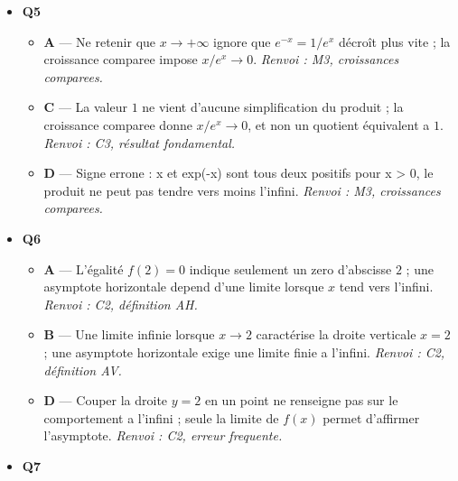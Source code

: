 \begin{itemize}
  \begin{itemize}
    \item \textbf{B} — L'élève evalue l'inverse en une valeur non nulle au lieu de faire tendre x vers 0 : 1/x explose, il ne se stabilise pas a 1. \emph{Renvoi : M1, limites en un point.}
    \item \textbf{C} — L'élève confond avec $\lim_{x\to+\infty} 1/x = 0$ ; en $0^+$, le dénominateur devient arbitrairement petit et positif, donc $1/x$ dépasse tout réel : la limite est $+\infty$. \emph{Renvoi : C1, limite en un point.}
    \item \textbf{D} — La limite $-\infty$ correspond a $x\to0^-$, ou $1/x$ est négatif ; ici $x\to0^+$ et le quotient reste positif. \emph{Renvoi : C1, limites a gauche/droite.}
  \end{itemize}
  \item \textbf{Q5}
  \begin{itemize}
    \item \textbf{A} — Ne retenir que $x\to+\infty$ ignore que $e^{-x}=1/e^x$ décroît plus vite ; la croissance comparee impose $x/e^x\to0$. \emph{Renvoi : M3, croissances comparees.}
    \item \textbf{C} — La valeur $1$ ne vient d'aucune simplification du produit ; la croissance comparee donne $x/e^x\to0$, et non un quotient équivalent a $1$. \emph{Renvoi : C3, résultat fondamental.}
    \item \textbf{D} — Signe errone : x et exp(-x) sont tous deux positifs pour x > 0, le produit ne peut pas tendre vers moins l'infini. \emph{Renvoi : M3, croissances comparees.}
  \end{itemize}
  \item \textbf{Q6}
  \begin{itemize}
    \item \textbf{A} — L'égalité $f(2)=0$ indique seulement un zero d'abscisse $2$ ; une asymptote horizontale depend d'une limite lorsque $x$ tend vers l'infini. \emph{Renvoi : C2, définition AH.}
    \item \textbf{B} — Une limite infinie lorsque $x\to2$ caractérise la droite verticale $x=2$ ; une asymptote horizontale exige une limite finie a l'infini. \emph{Renvoi : C2, définition AV.}
    \item \textbf{D} — Couper la droite $y=2$ en un point ne renseigne pas sur le comportement a l'infini ; seule la limite de $f(x)$ permet d'affirmer l'asymptote. \emph{Renvoi : C2, erreur frequente.}
  \end{itemize}
  \item \textbf{Q7}

\end{itemize}
